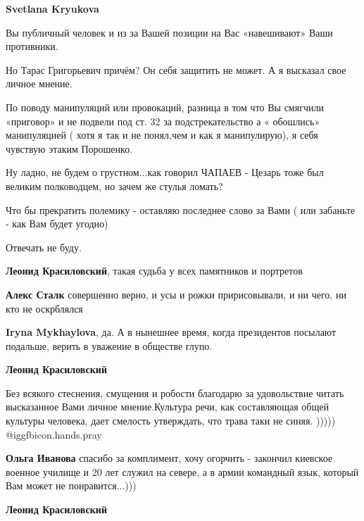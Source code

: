 \begin{multicols}{2}
\textbf{Svetlana Kryukova} 

Вы публичный человек и из за Вашей позиции на Вас «навешивают» Ваши противники.

Но Тарас Григорьевич причём? Он себя защитить не может. А я высказал свое
личное мнение.

По поводу манипуляций или провокаций, разница в том что Вы смягчили «приговор»
и не подвели под ст. 32 за подстрекательство а « обошлись» манипуляцией ( хотя
я так и не понял,чем и как я манипулирую), я себя чувствую этаким Порошенко.

Ну ладно, не будем о грустном...как говорил ЧАПАЕВ - Цезарь тоже был великим
полководцем, но зачем же стулья ломать?

Что бы прекратить полемику - оставляю последнее слово за Вами ( или забаньте -
как Вам будет угодно)

Отвечать не буду.

\textbf{Леонид Красиловский}, такая судьба у всех памятников и портретов

\textbf{Алекс Сталк} совершенно верно, и усы и рожки пририсовывали, и ни чего, ни кто не оскрблялся

\textbf{Iryna Mykhaylova}, да. А в нынешнее время, когда президентов посылают подальше, верить в уважение в обществе глупо.

\textbf{Леонид Красиловский} 

Без всякого стеснения, смущения и робости благодарю за удовольствие читать
высказанное Вами личное мнение.Культура речи, как составляющая общей культуры
человека, дает смелость утверждать, что трава таки не синяя. ))))) @igg{fbicon.hands.pray} 

\textbf{Ольга Иванова} спасибо за комплимент, хочу огорчить - закончил киевское военное училище и 20 лет служил на севере, а в армии командный язык, который Вам может не понравится...)))

\textbf{Леонид Красиловский} 


\end{multicols}

